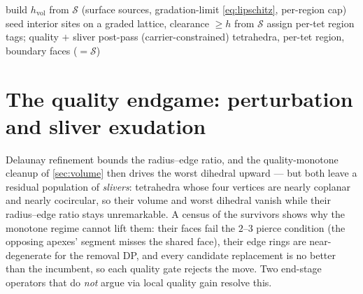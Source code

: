 \documentclass[11pt,a4paper]{article}
\numberwithin{equation}{section}
\begin{document}
\begin{algorithm}[H]
\caption{\textsc{MeshVolume}$(\mathcal{S},h)$}
\label{alg:vol}
build $h_{\text{vol}}$ from $\mathcal{S}$ (surface sources, gradation-limit
   \eqref{eq:lipschitz}, per-region cap)\;
seed interior sites on a graded lattice, clearance $\ge h$ from $\mathcal{S}$\;
assign per-tet region tags; quality $+$ sliver post-pass (carrier-constrained)\;
\Return tetrahedra, per-tet region, boundary faces ($=\mathcal{S}$)\;
\end{algorithm}

\section{The quality endgame: perturbation and sliver exudation}
\label{sec:endgame}
Delaunay refinement bounds the radius--edge ratio, and the quality-monotone
cleanup of \cref{sec:volume} then drives the worst dihedral upward --- but both
leave a residual population of \emph{slivers}: tetrahedra whose four vertices
are nearly coplanar and nearly cocircular, so their volume and worst dihedral
vanish while their radius--edge ratio stays unremarkable. A census of the
survivors shows why the monotone regime cannot lift them: their faces fail the
$2$--$3$ pierce condition (the opposing apexes' segment misses the shared
face), their edge rings are near-degenerate for the removal DP, and every
candidate replacement is no better than the incumbent, so each quality gate
rejects the move. Two end-stage operators that do \emph{not} argue via local
quality gain resolve this.
\end{document}
